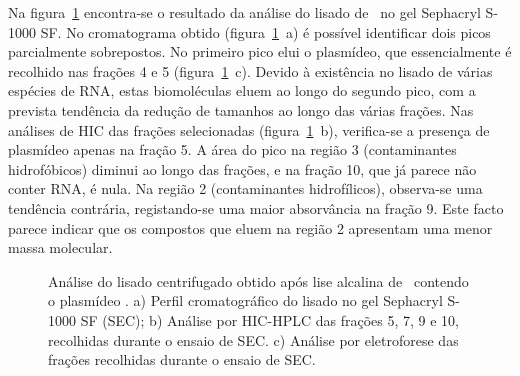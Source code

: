Na figura~\ref{fig:s1000} encontra-se o resultado da análise do lisado de \pVAX\ no gel Sephacryl S-1000 SF. No cromatograma obtido (figura~\ref{fig:s1000}~a) é possível identificar dois picos parcialmente sobrepostos. No primeiro pico elui o plasmídeo, que essencialmente é recolhido nas frações 4 e 5 (figura~\ref{fig:s1000}~c). Devido à existência no lisado de várias espécies de RNA, estas biomoléculas eluem ao longo do segundo pico, com a prevista tendência da redução de tamanhos ao longo das várias frações. Nas análises de HIC das frações selecionadas (figura~\ref{fig:s1000}~b), verifica-se a presença de plasmídeo apenas na fração 5. A área do pico na região 3 (contaminantes hidrofóbicos) diminui ao longo das frações, e na fração 10, que já parece não conter RNA, é nula. Na região 2 (contaminantes hidrofílicos), observa-se uma tendência contrária, registando-se uma maior absorvância na fração 9. Este facto parece indicar que os compostos que eluem na região 2 apresentam uma menor massa molecular.
\begin{figure}[!t]
    \centering
    
    \caption[Análise do lisado centrifugado com o gel Sephacryl S-1000.]{Análise do lisado centrifugado obtido após lise alcalina de \ecoli\ contendo o plasmídeo \pVAX. a) Perfil cromatográfico do lisado no gel Sephacryl S-1000 SF (SEC); b) Análise por HIC-HPLC das frações 5, 7, 9 e 10, recolhidas durante o ensaio de SEC. c) Análise por eletroforese das frações recolhidas durante o ensaio de SEC.}
    \label{fig:s1000}
\end{figure} 

